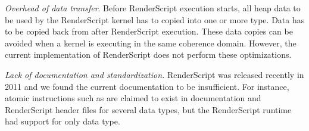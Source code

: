\textit{Overhead of data transfer}. Before RenderScript execution starts, all
heap data to be used by the RenderScript kernel has to copied into one or more
 type. Data has to be copied back from  after
RenderScript execution. These data copies can be avoided when a kernel is
executing in the same
coherence domain. However, the current implementation of RenderScript does not
perform these optimizations.

\textit{Lack of documentation and standardization.} RenderScript was released recently in 2011 and we found the current documentation to be insufficient. For instance, atomic instructions such as  are claimed to exist in documentation and RenderScript header files for several data types, but the RenderScript runtime had support for only  data type.


